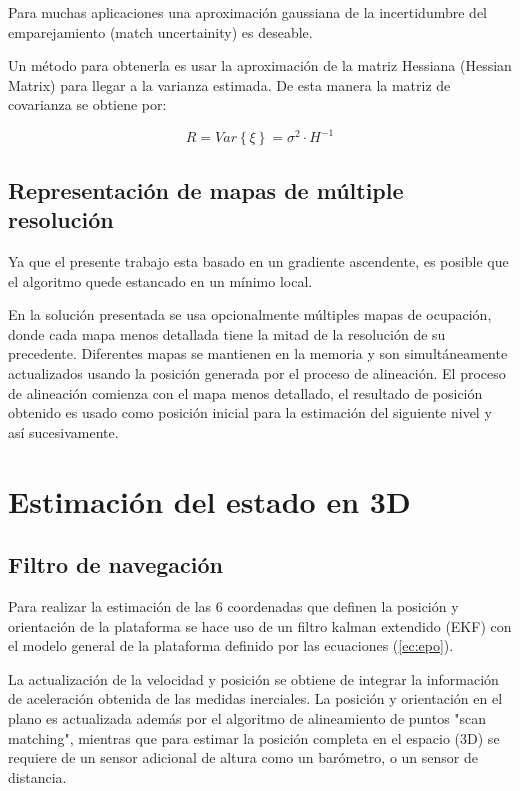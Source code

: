 \documentclass[10pt,a4paper]{article}
\begin{document}
Para muchas aplicaciones una aproximación gaussiana de la incertidumbre del emparejamiento (match uncertainity) es deseable.

Un método para obtenerla es usar la aproximación de la matriz Hessiana (Hessian Matrix) para llegar a la varianza estimada. De esta manera la matriz de covarianza se obtiene por:

\begin{equation}
\label{eq:RbyH}
	R = Var\left\{\xi\right\} = \sigma^{2} \cdot H^{-1}
\end{equation}

\subsection{Representación de mapas de múltiple resolución}

Ya que el presente trabajo esta basado en un gradiente ascendente, es posible que el algoritmo quede estancado en un mínimo local.

En la solución presentada se usa opcionalmente  múltiples mapas de ocupación, donde cada mapa menos detallada tiene la mitad de la resolución de su precedente. Diferentes mapas se mantienen en la memoria y son simultáneamente actualizados usando la posición generada por el proceso de alineación. El proceso de alineación comienza con el mapa menos detallado, el resultado de posición obtenido es usado como posición inicial para la estimación del siguiente nivel y así sucesivamente.

\section{Estimación del estado en 3D}

\subsection{Filtro de navegación}

Para realizar la estimación de las 6 coordenadas que definen la posición y orientación de la plataforma se hace uso de un filtro kalman extendido (EKF) con el modelo general de la plataforma definido por las ecuaciones (\ref{ec:epo}).

La actualización de la velocidad y posición se obtiene de integrar la información de aceleración obtenida de las medidas inerciales. La posición y orientación en el plano es actualizada además por el algoritmo de alineamiento de puntos "scan matching", mientras que para estimar la posición completa en el espacio (3D) se requiere de un sensor adicional de altura como un barómetro, o un sensor de distancia.
\end{document}
